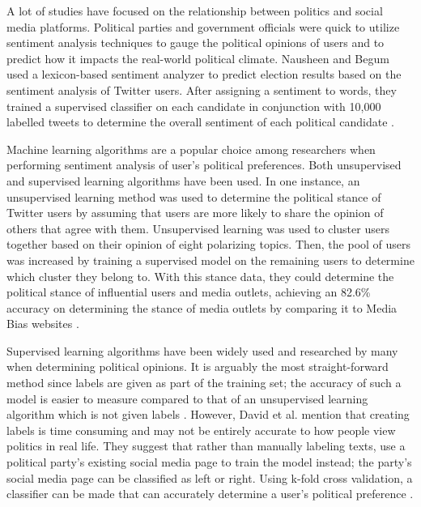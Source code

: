 \documentclass[letterpaper]{article} %
\begin{document}
A lot of studies have focused on the relationship between politics and social media platforms. Political parties and government officials were quick to utilize sentiment analysis techniques to gauge the political opinions of users and to predict how it impacts the real-world political climate. Nausheen and Begum used a lexicon-based sentiment analyzer to predict election results based on the sentiment analysis of Twitter users. After assigning a sentiment to words, they trained a supervised classifier on each candidate in conjunction with 10,000 labelled tweets to determine the overall sentiment of each political candidate \cite{nausheenSentiment}.

Machine learning algorithms are a popular choice among researchers when performing sentiment analysis of user’s political preferences. Both unsupervised and supervised learning algorithms have been used. In one instance, an unsupervised learning method was used to determine the political stance of Twitter users by assuming that users are more likely to share the opinion of others that agree with them. Unsupervised learning was used to cluster users together based on their opinion of eight polarizing topics. Then, the pool of users was increased by training a supervised model on the remaining users to determine which cluster they belong to. With this stance data, they could determine the political stance of influential users and media outlets, achieving an 82.6\% accuracy on determining the stance of media outlets by comparing it to Media Bias websites \cite{stefanovPredicting}.

Supervised learning algorithms have been widely used and researched by many when determining political opinions. It is arguably the most straight-forward method since labels are given as part of the training set; the accuracy of such a model is easier to measure compared to that of an unsupervised learning algorithm which is not given labels \cite{khardeSentiment}. However, David et al. mention that creating labels is time consuming and may not be entirely accurate to how people view politics in real life. They suggest that rather than manually labeling texts, use a political party’s existing social media page to train the model instead; the party’s social media page can be classified as left or right. Using k-fold cross validation, a classifier can be made that can accurately determine a user’s political preference \cite{davidUtilizing}.
\end{document}
